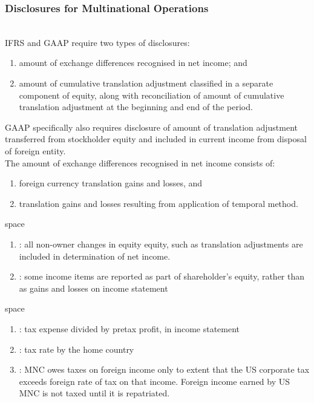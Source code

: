 \subsubsection{Disclosures for Multinational Operations}

\begin{remark} \\
IFRS and GAAP require two types of disclosures:
\begin{enumerate}[label=\roman*.]
\setlength{\itemsep}{0pt}
\item amount of exchange differences recognised in net income; and
\item amount of cumulative translation adjustment classified in a separate component of equity, along with reconciliation of amount of cumulative translation adjustment at the beginning and end of the period.
\end{enumerate}
GAAP specifically also requires disclosure of amount of translation adjustment transferred from stockholder equity and included in current income from disposal of foreign entity.\\
The amount of exchange differences recognised in net income consists of:
\begin{enumerate}[label=\roman*.]
\setlength{\itemsep}{0pt}
\item foreign currency translation gains and losses, and
\item translation gains and losses resulting from application of temporal method.
\end{enumerate}
\end{remark}

\begin{definition} {\color{white}space}
\begin{enumerate}[label=\roman*.]
\setlength{\itemsep}{0pt}
\item {}: all non-owner changes in equity equity, such as translation adjustments are included in determination of net income.
\item {}: some income items are reported as part of shareholder's equity, rather than as gains and losses on income statement
\end{enumerate}
\end{definition}

\begin{definition} {\color{white}space}
\begin{enumerate}[label=\roman*.]
\setlength{\itemsep}{0pt}
\item {}: tax expense divided by pretax profit, in income statement
\item {}: tax rate by the home country
\item {}: MNC owes taxes on foreign income only to extent that the US corporate tax exceeds foreign rate of tax on that income. Foreign income earned by US MNC is not taxed until it is repatriated.
\end{enumerate}
\end{definition}

